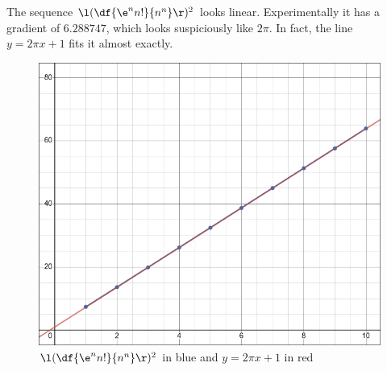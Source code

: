 \documentclass[a4paper]{article}
\begin{document}
The sequence $\l(\df{\e^n n!}{n^n}\r)^2$ looks linear. Experimentally it has a gradient of $6.288747$, which looks suspiciously like $2\pi$. In fact, the line $y = 2\pi x + 1$ fits it almost exactly.

\begin{figure}[h]
	\centering
	\includegraphics[scale=0.4]{Q4c}
	\caption{$\l(\df{\e^n n!}{n^n}\r)^2$ in blue and $y = 2\pi x + 1$ in red}
\end{figure}
\end{document}
